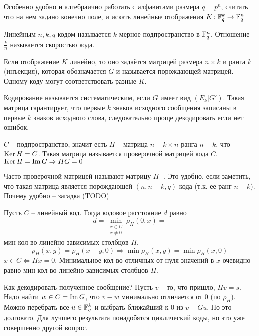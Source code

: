 Особенно удобно и алгебраично работать с алфавитами размера $q=p^n$, считать что на нем задано конечно поле, и искать линейные отображения $K \colon \mathbb{F}_q^k \to \mathbb{F}_q^n$ 

\dfn Линейным $n,k,q$-кодом называется $k$-мерное подпространство в $\mathbb{F}_q^n$. Отношение $\frac{k}{n}$ называется скоростью кода.
\edfn

Если отображение $K$ линейно, то оно задаётся матрицей размера $n\times k$ и ранга $k$ (инъекция), которая обозначается $G$ и называется порождающей матрицей. Одному коду могут соответствовать разные $K$.

\dfn Кодирование называется систематическим, если $G$ имеет вид $(E_k|G')$. Такая матрица гарантирует, что первые $k$ знаков исходного сообщения записаны в первые $k$ знаков исходного слова, следовательно проще декодировать если нет ошибок.
\edfn

\dfn
$C$ -- подпространство, значит есть $H$ -- матрица $n-k\times n$ ранга $n-k$, что $\operatorname{Ker} H = C$. Такая матрица называется проверочной матрицей кода $C$. $\operatorname{Ker} H = \operatorname{Im} G \Rightarrow HG = 0$
\edfn

Часто проверочной матрицей называют матрицу $H^{\top}$. Это удобно, если заметить, что такая матрица является порождающей  $(n,n-k,q)$ кода (т.к. ее ранг $n-k$). Почему удобно -- загадка (TODO)

\lm Пусть $C$ -- линейный код. Тогда кодовое расстояние $d$ равно 
$$d=\min_{\substack{x \in C \\ x\neq 0} } \rho_H(0,x) = $$ мин кол-во линейно зависимых столбцов $H$.
\proof 
$$\rho_H(x, y) = \rho_H(x-y, 0) \Rightarrow \min \rho_H(x, y) = \min \rho_H(x, 0)$$
$x \in C \Leftrightarrow Hx = 0$. Минимальное кол-во отличных от нуля значений в $x$ очевидно равно мин кол-во линейно зависимых столбцов $H$.
\endproof
\elm

Как декодировать полученное сообщение? Пусть $v$ -- то, что пришло, $Hv=s$. Надо найти $w \in C = \operatorname{Im} G$, что $v-w$ минимально отличается от $0$ (по $\rho_H$). Можно перебрать все $u \in \mathbb{F}_q^k$ и выбрать ближайший к $0$ из $v - Gu$. Но это долговато. Для лучшего результата понадобятся циклический коды, но это уже совершенно другой вопрос.